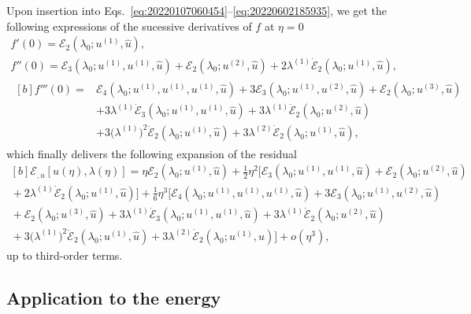 \documentclass[12pt, final]{scrartcl}
\theoremstyle{definition}
\newcommand{\E}{\mathcal E}
\newcommand{\order}[2][1]{#2^{(#1)}}
\begin{document}
Upon insertion into Eqs.~\eqref{eq:20220107060454}--\eqref{eq:20220602185935},
we get the following expressions of the sucessive derivatives of $f$ at
$η=0$
\begin{gather*}
  f'(0) = \E_2(\lambda_0; \order[1]u, \hat{u}),\\
  f''(0) = \E_3(\lambda_0; \order[1]u, \order[1]u, \hat{u}) + \E_2(\lambda_0; \order[2]u, \hat{u}) + 2 \order[1]\lambda \dot{\E}_2(\lambda_0; \order[1]u, \hat{u}),\\
  \begin{aligned}[b]
    f'''(0) ={}
    & \E_4(\lambda_0; \order[1]u, \order[1]u, \order[1]u, \hat{u}) + 3\E_3(\lambda_0; \order[1]u, \order[2]u, \hat{u}) + \E_2(\lambda_0 ; \order[3]u, \hat{u})\\
    & + 3\order[1]\lambda \dot{\E}_3(\lambda_0; \order[1]u, \order[1]u, \hat{u}) + 3\order[1]\lambda \dot{\E}_2(\lambda_0; \order[2]u, \hat{u})\\
    & + 3 \bigl( \order[1]\lambda \bigr)^2 \ddot{\E}_2(\lambda_0; \order[1]u, \hat{u}) + 3 \order[2]\lambda \dot{\E}_2(\lambda_0; \order[1]u, \hat{u}),
  \end{aligned}
\end{gather*}
which finally delivers the following expansion of the residual
\begin{equation}
  \label{eq:20220107080901}
  \begin{gathered}[b]
    \E_{, u}[u(η), \lambda(η)] ={} η \E_2(\lambda_0; \order[1]u, \hat{u}) + \tfrac{1}{2} η^2 \bigl[\E_3(\lambda_0; \order[1]u, \order[1]u, \hat{u})  + \E_2(\lambda_0; \order[2]u, \hat{u})\\
    {} + 2 \order[1]\lambda \dot{\E}_2(\lambda_0; \order[1]u, \hat{u})\bigr] + \tfrac{1}{6} η^3 \bigl[ \E_4(\lambda_0; \order[1]u, \order[1]u, \order[1]u, \hat{u}) + 3\E_3(\lambda_0; \order[1]u, \order[2]u, \hat{u})\\
    {} + \E_2(\lambda_0; \order[3]u, \hat{u}) + 3\order[1]\lambda \dot{\E}_3(\lambda_0; \order[1]u, \order[1]u, \hat{u}) + 3\order[1]\lambda \dot{\E}_2(\lambda_0; \order[2]u, \hat{u})\\
    {} + 3 \bigl( \order[1]\lambda \bigr)^2 \ddot{\E}_2(\lambda_0; \order[1]u, \hat{u}) + 3 \order[2]\lambda \dot{\E}_2(\lambda_0 ; \order[1]u, \hat{u}) \bigr] + o(η^3),
  \end{gathered}
\end{equation}
up to third-order terms.

\subsection{Application to the energy}
\label{sec:20220525053434}
%
\end{document}
